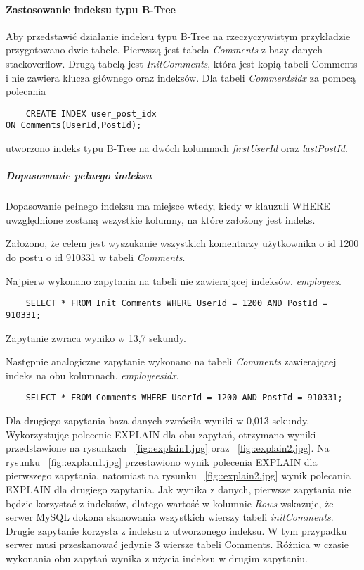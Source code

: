 \paragraph{Zastosowanie indeksu typu B-Tree}\mbox{}

Aby przedstawić działanie indeksu typu B-Tree na rzeczyczywistym przykładzie przygotowano dwie tabele. Pierwszą jest tabela \textit{Comments} z bazy danych stackoverflow. Drugą tabelą jest \textit{Init\textunderscore Comments}, która jest kopią tabeli Comments i nie zawiera klucza głównego oraz indeksów.
Dla tabeli \textit{Comments\textunderscore idx} za pomocą polecania \begin{verbatim}
    CREATE INDEX user_post_idx 
ON Comments(UserId,PostId);
\end{verbatim}
utworzono indeks typu B-Tree na dwóch kolumnach \textit{first\textunderscore UserId} oraz \textit{last\textunderscore PostId}.

\subparagraph{Dopasowanie pełnego indeksu}\mbox{}

Dopasowanie pełnego indeksu ma miejsce wtedy, kiedy w klauzuli WHERE uwzględnione zostaną wszystkie kolumny, na które założony jest indeks. 

Założono, że celem jest wyszukanie wszystkich komentarzy użytkownika o id 1200 do postu o id 910331 w tabeli \textit{Comments}.

Najpierw wykonano zapytania na tabeli nie zawierającej indeksów.
 \textit{employees}. 
\begin{verbatim}
    SELECT * FROM Init_Comments WHERE UserId = 1200 AND PostId = 910331;
\end{verbatim}
Zapytanie zwraca wyniko w 13,7 sekundy.

Następnie analogiczne zapytanie wykonano na tabeli \textit{Comments} zawierającej indeks na obu kolumnach.
\textit{employees\textunderscore idx}. 
\begin{verbatim}
    SELECT * FROM Comments WHERE UserId = 1200 AND PostId = 910331;
\end{verbatim}
Dla drugiego zapytania baza danych zwróciła wyniki w 0,013 sekundy. Wykorzystując polecenie EXPLAIN dla obu zapytań, otrzymano wyniki przedstawione na rysunkach ~\ref{fig::explain1.jpg} oraz ~\ref{fig::explain2.jpg}. Na rysunku ~\ref{fig::explain1.jpg} przestawiono wynik polecenia EXPLAIN dla pierwszego zapytania, natomiast na rysunku ~\ref{fig::explain2.jpg} wynik polecania EXPLAIN dla drugiego zapytania. Jak wynika z danych, pierwsze zapytania nie będzie korzystać z indeksów, dlatego wartość w kolumnie \textit{Rows} wskazuje, że serwer MySQL dokona skanowania wszystkich wierszy tabeli \textit{init\textunderscore Comments}. Drugie zapytanie korzysta z indeksu z utworzonego indeksu. W tym przypadku serwer musi przeskanować jedynie 3 wiersze tabeli Comments. Różnica w czasie wykonania obu zapytań wynika z użycia indeksu w drugim zapytaniu.

